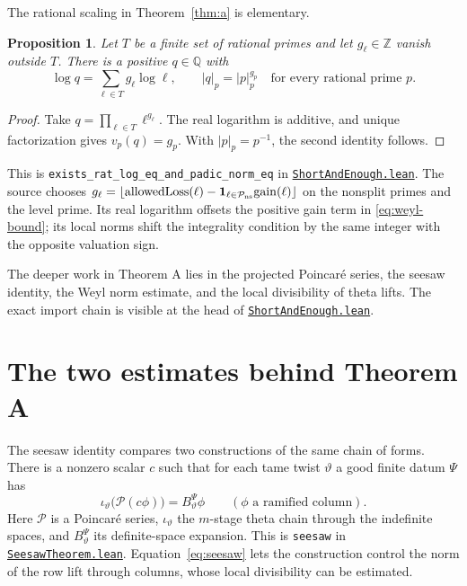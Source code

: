 \documentclass[11pt,oneside,openany]{amsbook}
\newtheorem{proposition}[theorem]{Proposition}
\theoremstyle{remark}
\numberwithin{equation}{section}
\newcommand{\Q}{\mathbb Q}
\newcommand{\Z}{\mathbb Z}
\newcommand{\ghroot}{https://github.com/lsernau/grh-lean/blob/}
\newcommand{\ghrev}{72fead102f663d5c7a407964a13dc0cf9d977207}
\newcommand{\leanfile}[2]{%
  \href{\ghroot\ghrev/grh-compact/src/#1}{\nolinkurl{#2}}}
\begin{document}
The rational scaling in Theorem~\ref{thm:a} is elementary.
\begin{proposition}
\label{prop:rational-scaling}
Let $T$ be a finite set of rational primes and let
$g_\ell\in\Z$ vanish outside $T$. There is a positive
$q\in\Q$ with
\[
\log q=\sum_{\ell\in T}g_\ell\log\ell,
\qquad |q|_p=|p|_p^{g_p}
\quad\text{for every rational prime }p.
\]
\end{proposition}
\begin{proof}
Take $q=\prod_{\ell\in T}\ell^{g_\ell}$.
The real logarithm is additive, and unique factorization
gives $v_p(q)=g_p$. With $|p|_p=p^{-1}$, the second
identity follows.
\end{proof}
This is \texttt{exists\_rat\_log\_eq\_and\_padic\_norm\_eq}
in \leanfile{New/Endgame/ShortAndEnough.lean}%
{ShortAndEnough.lean}. The source chooses
$g_\ell=\lfloor\mathrm{allowedLoss}(\ell)-
\mathbf1_{\ell\in\mathcal P_{\rm ns}}
\mathrm{gain}(\ell)\rfloor$ on the nonsplit primes
and the level prime. Its real logarithm offsets the
positive gain term in \eqref{eq:weyl-bound}; its local
norms shift the integrality condition by the same integer
with the opposite valuation sign.

The deeper work in Theorem A lies in the projected Poincar\'e
series, the seesaw identity, the Weyl norm estimate, and the
local divisibility of theta lifts. The exact import chain is
visible at the head of
\leanfile{New/Endgame/ShortAndEnough.lean}{ShortAndEnough.lean}.

\section{The two estimates behind Theorem A}
\label{sec:a-mechanisms}
The seesaw identity compares two constructions of the same
chain of forms. There is a nonzero scalar $c$ such that for
each tame twist $\vartheta$ a good finite datum $\Psi$ has
\begin{equation}
\label{eq:seesaw}
\iota_\vartheta\bigl(\mathcal P(c\phi)\bigr)
 =B^\Psi_\vartheta\phi
\qquad(\phi\text{ a ramified column}).
\end{equation}
Here $\mathcal P$ is a Poincar\'e series, $\iota_\vartheta$
the $m$-stage theta chain through the indefinite spaces, and
$B^\Psi_\vartheta$ its definite-space expansion. This is
\texttt{seesaw} in
\leanfile{New/Seesaw/SeesawTheorem.lean}{SeesawTheorem.lean}.
Equation~\eqref{eq:seesaw} lets the construction control
the norm of the row lift through columns, whose local
divisibility can be estimated.
\end{document}
